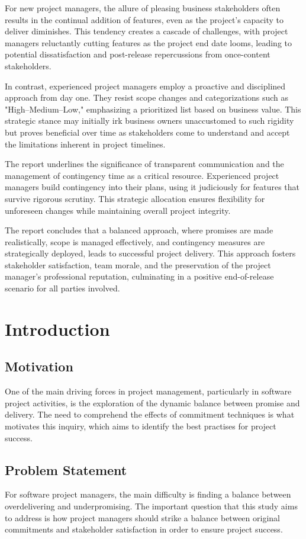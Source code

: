 \documentclass[12pt]{article}
\begin{document}
For new project managers, the allure of pleasing business stakeholders often results in the continual addition of features, even as the project's capacity to deliver diminishes. This tendency creates a cascade of challenges, with project managers reluctantly cutting features as the project end date looms, leading to potential dissatisfaction and post-release repercussions from once-content stakeholders.

In contrast, experienced project managers employ a proactive and disciplined approach from day one. They resist scope changes and categorizations such as "High–Medium–Low," emphasizing a prioritized list based on business value. This strategic stance may initially irk business owners unaccustomed to such rigidity but proves beneficial over time as stakeholders come to understand and accept the limitations inherent in project timelines.

The report underlines the significance of transparent communication and the management of contingency time as a critical resource. Experienced project managers build contingency into their plans, using it judiciously for features that survive rigorous scrutiny. This strategic allocation ensures flexibility for unforeseen changes while maintaining overall project integrity.

The report concludes that a balanced approach, where promises are made realistically, scope is managed effectively, and contingency measures are strategically deployed, leads to successful project delivery. This approach fosters stakeholder satisfaction, team morale, and the preservation of the project manager's professional reputation, culminating in a positive end-of-release scenario for all parties involved.
\pagebreak
\tableofcontents
\newpage
\section{Introduction} 
\subsection{Motivation}
   One of the main driving forces in project management, particularly in software project activities, is the exploration of the dynamic balance between promise and delivery. The need to comprehend the effects of commitment techniques is what motivates this inquiry, which aims to identify the best practises for project success.
\subsection{Problem Statement}
   For software project managers, the main difficulty is finding a balance between overdelivering and underpromising. The important question that this study aims to address is how project managers should strike a balance between original commitments and stakeholder satisfaction in order to ensure project success.
\end{document}
